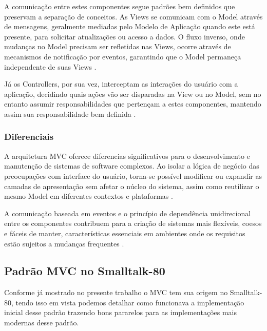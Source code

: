             \par A comunicação entre estes componentes segue padrões bem definidos que preservam a separação de conceitos. As Views se comunicam com o Model através de mensagens, geralmente mediadas pelo Modelo de Aplicação quando este está presente, para solicitar atualizações ou acesso a dados. O fluxo inverso, onde mudanças no Model precisam ser refletidas nas Views, ocorre através de mecanismos de notificação por eventos, garantindo que o Model permaneça independente de suas Views \cite{artigo:deacon:2009}.
            
            \par Já os Controllers, por sua vez, interceptam as interações do usuário com a aplicação, decidindo quais ações vão ser disparadas na View ou no Model, sem no entanto assumir responsabilidades que pertençam a estes componentes, mantendo assim sua responsabilidade bem definida \cite{artigo:deacon:2009}.
            
        \subsubsection{Diferenciais}
            \par A arquitetura MVC oferece diferencias significativos para o desenvolvimento e manutenção de sistemas de software complexos. Ao isolar a lógica de negócio das preocupações com interface do usuário, torna-se possível modificar ou expandir as camadas de apresentação sem afetar o núcleo do sistema, assim como reutilizar o mesmo Model em diferentes contextos e plataformas \cite{artigo:deacon:2009}.
            
            \par A comunicação baseada em eventos e o princípio de dependência unidirecional entre os componentes contribuem para a criação de sistemas mais flexíveis, coesos e fáceis de manter, características essenciais em ambientes onde os requisitos estão sujeitos a mudanças frequentes \cite{artigo:deacon:2009}.

    \subsection{Padrão MVC no Smalltalk-80}

        \par Conforme já mostrado no presente trabalho o MVC tem sua origem no Smalltalk-80, tendo isso em vista podemos detalhar como funcionava a implementação inicial desse padrão trazendo bons pararelos para as implementações mais modernas desse padrão.
    

